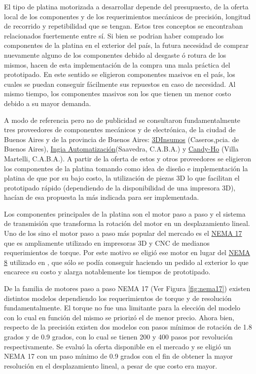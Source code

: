 El tipo de platina motorizada a desarrollar depende del presupuesto, de la oferta local de los componentes y de los requerimientos mecánicos de precisión, longitud de recorrido y repetibilidad que se tengan. Estos tres conceptos se encontraban relacionados fuertemente entre sí. Si bien se podrian haber comprado los componentes de la platina en el exterior del país, la futura necesidad de comprar nuevamente alguno de los componentes debido al desgaste ó rotura de los mismos, hacen de esta implementación de la compra una mala práctica del prototipado. En este sentido se eligieron componentes masivos en el país, los cuales se puedan conseguir fácilmente sus repuestos en caso de necesidad. Al mismo tiempo, los componentes masivos son los que tienen un menor costo debido a su mayor demanda.

A modo de referencia pero no de publicidad se consultaron fundamentalmente tres proveedores de componentes mecánicos y de electrónica, de la ciudad de Buenos Aires y de la provincia de Buenos Aires: \href{https://3dinsumos.com.ar/}{3DInsumos} (Caseros,pcia. de Buenos Aires), \href{https://ingia.com.ar/}{Ingia Automatización}(Saavedra, C.A.B.A.) y \href{https://candy-ho.com/}{Candy-Ho} (Villa Martelli, C.A.B.A.). A partir de la oferta de estos y otros proveedores se eligieron los componentes de la platina tomando como idea de diseño e implementación la platina de \cite{schaa} que por su bajo costo, la utilización de piezas 3D lo que facilitan el prototipado rápido (dependiendo de la disponibilidad de una impresora 3D), hacían de esa propuesta la más indicada para ser implementada.

Los componentes principales de la platina son el motor paso a paso y el sistema de transmisión que transforma la rotación del motor en un desplazamiento lineal. Uno de los sino el motor paso a paso más popular del mercado es el \href{https://www.pololu.com/product/1200}{NEMA 17} que es ampliamente utilizado en impresoras 3D y CNC de medianos requerimientos de torque. Por este motivo se eligió ese motor en lugar del \href{https://www.pololu.com/product/1204}{NEMA 8} utilizado en \cite{schaa}, que sólo se podía conseguir haciendo un pedido al exterior lo que encarece su costo y alarga notablemente los tiempos de prototipado.

De la familia de motores paso a paso NEMA 17 (Ver Figura \ref{fig:nema17}) existen distintos modelos dependiendo los requerimientos de torque y de resolución fundamentalmente. El torque no fue una limitante para la elección del modelo con lo cual en función del mismo se priorizó el de menor precio. Ahora bien, respecto de la precisión existen dos modelos con pasos mínimos de rotación de 1.8 grados y de 0.9 grados, con lo cual se tienen 200 y 400 pasos por revolución respectivamente. Se evaluó la oferta disponible en el mercado y se eligió un NEMA 17 con un paso mínimo de 0.9 grados con el fin de obtener la mayor resolución en el desplazamiento lineal, a pesar de que costo era mayor.

